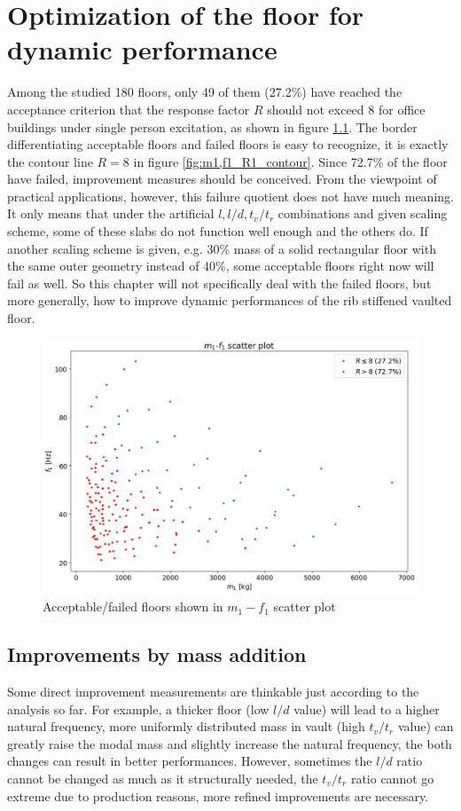 \chapter{Optimization of the floor for dynamic performance}
\label{chap5}
Among the studied 180 floors, only 49 of them (27.2\%) have reached the acceptance criterion that the response factor $R$ should not exceed 8 for office buildings under single person excitation, as shown in figure \ref{fig:m1_f1_fail}. The border differentiating acceptable floors and failed floors is easy to recognize, it is exactly the contour line $R=8$ in figure \ref{fig:m1,f1_R1_contour}. Since 72.7\%  of the floor have failed, improvement measures should be conceived. From the viewpoint of practical applications, however, this failure quotient does not have much meaning. It only means that under the artificial $l,l/d,t_v/t_r$ combinations and given scaling scheme, some of these slabs do not function well enough and the others do. If another scaling scheme is given, e.g. 30\% mass of a solid rectangular floor with the same outer geometry instead of 40\%, some acceptable floors right now will fail as well. So this chapter will not specifically deal with the failed floors, but more generally, how to improve dynamic performances of the rib stiffened vaulted floor.
\begin{figure}[H]
\centering
\includegraphics[width=.8\textwidth]{images/m1_f1_fail}
\caption{Acceptable/failed floors shown in $m_1-f_1$ scatter plot}
\label{fig:m1_f1_fail}
\end{figure}

\section{Improvements by mass addition}
Some direct improvement measurements are thinkable just according to the analysis so far. For example, a thicker floor (low $l/d$ value) will lead to a higher natural frequency, more uniformly distributed mass in vault (high $t_v/t_r$ value) can greatly raise the modal mass and slightly increase the natural frequency, the both changes can result in better performances. However, sometimes the $l/d$ ratio cannot be changed as much as it structurally needed, the $t_v/t_r$ ratio cannot go extreme due to production reasons, more refined improvements are necessary. 

